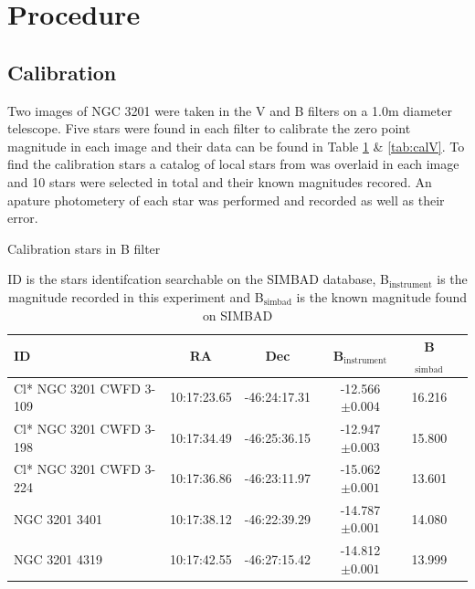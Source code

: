 \documentclass[11pt]{article}
\begin{document}
\section{Procedure}

\subsection{Calibration}

Two images of NGC 3201 were taken in the V and B filters on a 1.0m diameter telescope. Five stars were found in each filter to calibrate the zero point magnitude in each image and their data can be found in Table \ref{tab:calB} \& \ref{tab:calV}. To find the calibration stars a catalog of local stars from \citet{simbad} was overlaid in each image and 10 stars were selected in total and their known magnitudes recored. An apature photometery of each star was performed and recorded as well as their error.

\begin{table}[H]
\centering
\caption{Calibration stars in B filter}
\begin{tabular}{lccccc}
\toprule
ID & RA & Dec & B$_{\text{instrument}}$ & B$_{\text{simbad}}$ \\
\midrule
Cl* NGC 3201 CWFD 3-109 &  10:17:23.65 &  -46:24:17.31 & -12.566$\pm 0.004$ & 16.216 \\                  
Cl* NGC 3201 CWFD 3-198 &  10:17:34.49 &  -46:25:36.15 & -12.947$\pm 0.003$ & 15.800 \\                 
Cl* NGC 3201 CWFD 3-224 &  10:17:36.86 &  -46:23:11.97 & -15.062$\pm 0.001$ & 13.601 \\                 
NGC 3201 3401 &  10:17:38.12 &  -46:22:39.29 & -14.787$\pm 0.001$ & 14.080 \\                           
NGC 3201 4319 &  10:17:42.55 &  -46:27:15.42 & -14.812$\pm 0.001$ & 13.999 \\
\bottomrule
\end{tabular}
\caption*{ID is the stars identifcation searchable on the SIMBAD database, B$_{\text{instrument}}$ is the magnitude recorded in this experiment and B$_{\text{simbad}}$ is the known magnitude found on SIMBAD \citep{simbad}}
\label{tab:calB}
\end{table}
\end{document}
